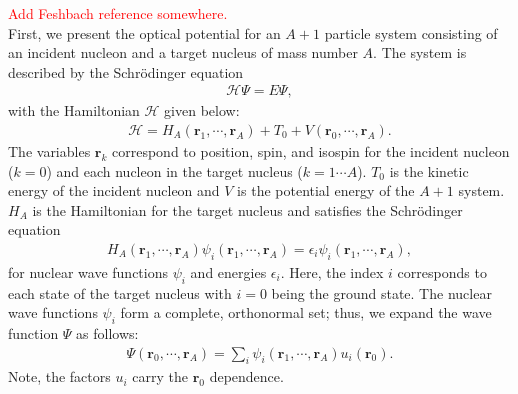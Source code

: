 \documentclass[preprintnumbers,floatfix,aps,prc,preprint,nofootinbib]{revtex4-1}
\begin{document}
\textcolor{red}{Add Feshbach reference somewhere.}
\\

First, we present the optical potential for an $A+1$ particle system consisting of an incident nucleon and a target nucleus of mass number $A$. The system is described by the Schr\"odinger equation
%
\begin{eqnarray}
	\label{eq:schrodinger_equation}
	\mathcal{H} \Psi = E \Psi,
\end{eqnarray}
%
with the Hamiltonian $\mathcal{H}$ given below:
%
\begin{eqnarray}
	\label{eq:total_hamiltonian}
	\mathcal{H} = H_A(\textbf{r}_1, \cdots , \textbf{r}_A) + T_0 + V(\textbf{r}_0, \cdots , \textbf{r}_A).
\end{eqnarray}
%
The variables $\textbf{r}_k$ correspond to position, spin, and isospin for the incident nucleon ($k=0$) and each nucleon in the target nucleus ($k=1 \cdots A$). $T_0$ is the kinetic energy of the incident nucleon and $V$ is the potential energy of the $A+1$ system. $H_A$ is the Hamiltonian for the target nucleus and satisfies the Schr\"odinger equation
%
\begin{eqnarray}
	\label{eq:nuclear_schrodinger_equation}
	H_A(\textbf{r}_1, \cdots , \textbf{r}_A) \psi_i(\textbf{r}_1, \cdots , \textbf{r}_A) = \epsilon_i \psi_i(\textbf{r}_1, \cdots , \textbf{r}_A),
\end{eqnarray}
%
for nuclear wave functions $\psi_i$ and energies $\epsilon_i$. Here, the index $i$ corresponds to each state of the target nucleus with $i=0$ being the ground state. The nuclear wave functions $\psi_i$ form a complete, orthonormal set; thus, we expand the wave function $\Psi$ as follows:
%
\begin{eqnarray}
	\label{eq:wave_function}
	\Psi(\textbf{r}_0, \cdots , \textbf{r}_A) = \sum_{i} \psi_i(\textbf{r}_1, \cdots , \textbf{r}_A) u_i(\textbf{r}_0).
\end{eqnarray}
%
Note, the factors $u_i$ carry the $\textbf{r}_0$ dependence.
\\
\end{document}
